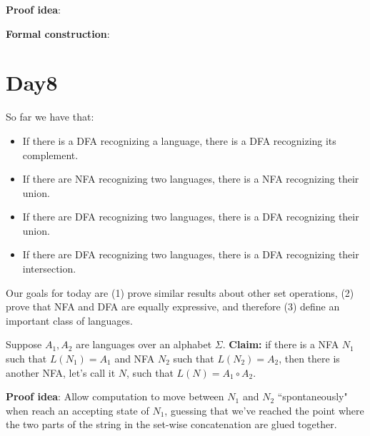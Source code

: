\documentclass[12pt, oneside]{article}
\begin{document}
    {\bf Proof idea}:
    
    
    {\bf Formal construction}: 
    
    \vspace{70pt}


    
 \vfill
\section*{Day8}


So far we have that: 
\begin{itemize}
\item If there is a DFA recognizing a language, there is a DFA recognizing its complement.
\item If there are NFA recognizing two languages, there is a NFA recognizing their union.
\item If there are DFA recognizing two languages, there is a DFA recognizing their union.
\item If there are DFA recognizing two languages, there is a DFA recognizing their intersection.
\end{itemize}

Our goals for today are (1) prove similar results about other set operations, (2) prove that 
NFA and DFA are equally expressive, and therefore (3) define an important class of languages.

\vfill

\newpage
Suppose $A_1, A_2$ are languages over an alphabet $\Sigma$.
{\bf Claim:} if there is a NFA $N_1$ such that $L(N_1) = A_1$ and 
NFA $N_2$ such that $L(N_2) = A_2$, then there is another NFA, let's call it $N$, such that 
$L(N) = A_1 \circ A_2$.

{\bf Proof idea}: Allow computation to move between $N_1$ and $N_2$ ``spontaneously" when reach an accepting state of 
$N_1$, guessing that we've reached the point where the two parts of the string in the set-wise concatenation 
are glued together.
\end{document}
